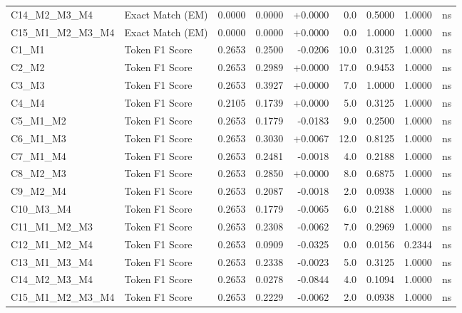 \begin{table}[p]
\begin{tabular*}{\textwidth}{@{\extracolsep{\fill}} l l r r r r r r c @{}}
\addlinespace
C14\_M2\_M3\_M4 & Exact Match (EM)     & 0.0000 & 0.0000 & +0.0000 & 0.0 & 0.5000 & 1.0000 & ns \\
\addlinespace
C15\_M1\_M2\_M3\_M4 & Exact Match (EM)     & 0.0000 & 0.0000 & +0.0000 & 0.0 & 1.0000 & 1.0000 & ns \\
\addlinespace
C1\_M1          & Token F1 Score       & 0.2653 & 0.2500 & -0.0206 & 10.0 & 0.3125 & 1.0000 & ns \\
\addlinespace
C2\_M2          & Token F1 Score       & 0.2653 & 0.2989 & +0.0000 & 17.0 & 0.9453 & 1.0000 & ns \\
\addlinespace
C3\_M3          & Token F1 Score       & 0.2653 & 0.3927 & +0.0000 & 7.0 & 1.0000 & 1.0000 & ns \\
\addlinespace
C4\_M4          & Token F1 Score       & 0.2105 & 0.1739 & +0.0000 & 5.0 & 0.3125 & 1.0000 & ns \\
\addlinespace
C5\_M1\_M2      & Token F1 Score       & 0.2653 & 0.1779 & -0.0183 & 9.0 & 0.2500 & 1.0000 & ns \\
\addlinespace
C6\_M1\_M3      & Token F1 Score       & 0.2653 & 0.3030 & +0.0067 & 12.0 & 0.8125 & 1.0000 & ns \\
\addlinespace
C7\_M1\_M4      & Token F1 Score       & 0.2653 & 0.2481 & -0.0018 & 4.0 & 0.2188 & 1.0000 & ns \\
\addlinespace
C8\_M2\_M3      & Token F1 Score       & 0.2653 & 0.2850 & +0.0000 & 8.0 & 0.6875 & 1.0000 & ns \\
\addlinespace
C9\_M2\_M4      & Token F1 Score       & 0.2653 & 0.2087 & -0.0018 & 2.0 & 0.0938 & 1.0000 & ns \\
\addlinespace
C10\_M3\_M4     & Token F1 Score       & 0.2653 & 0.1779 & -0.0065 & 6.0 & 0.2188 & 1.0000 & ns \\
\addlinespace
C11\_M1\_M2\_M3 & Token F1 Score       & 0.2653 & 0.2308 & -0.0062 & 7.0 & 0.2969 & 1.0000 & ns \\
\addlinespace
C12\_M1\_M2\_M4 & Token F1 Score       & 0.2653 & 0.0909 & -0.0325 & 0.0 & 0.0156 & 0.2344 & ns \\
\addlinespace
C13\_M1\_M3\_M4 & Token F1 Score       & 0.2653 & 0.2338 & -0.0023 & 5.0 & 0.3125 & 1.0000 & ns \\
\addlinespace
C14\_M2\_M3\_M4 & Token F1 Score       & 0.2653 & 0.0278 & -0.0844 & 4.0 & 0.1094 & 1.0000 & ns \\
\addlinespace
C15\_M1\_M2\_M3\_M4 & Token F1 Score       & 0.2653 & 0.2229 & -0.0062 & 2.0 & 0.0938 & 1.0000 & ns \\

\end{tabular*}
\end{table}
